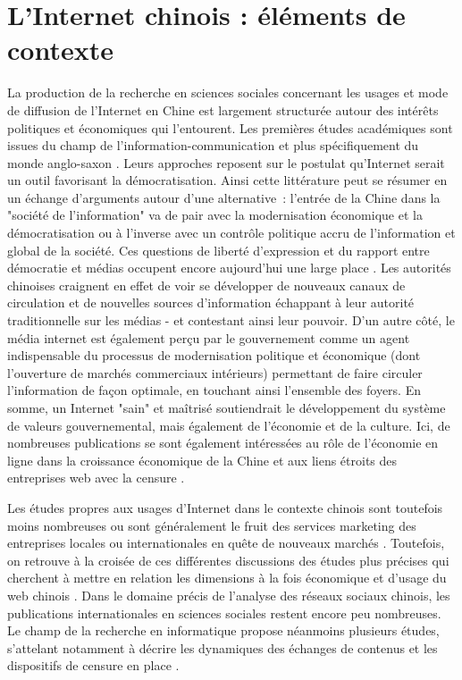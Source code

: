 \section{L’Internet chinois : éléments de contexte }
\label{sec:internet-chine}
La production de la recherche en sciences sociales concernant les usages et mode de diffusion de l’Internet en Chine est largement structurée autour des intérêts politiques et économiques qui l’entourent. Les premières études académiques sont issues du champ de l’information-communication et plus spécifiquement du monde anglo-saxon \citep{Johnson1996,Qiu2005}. Leurs approches reposent sur le postulat qu'Internet serait un outil favorisant la démocratisation. Ainsi cette littérature peut se résumer en un échange d'arguments autour d'une alternative : l'entrée de la Chine dans la "société de l'information" va de pair avec la modernisation économique et la démocratisation ou à l’inverse avec un contrôle politique accru de l'information et global de la société. Ces questions de liberté d’expression et du rapport entre démocratie et médias occupent encore aujourd’hui une large place \citep{MacKinnon2009, Douzet2007, Yang2008}. Les autorités chinoises craignent en effet de voir se développer de nouveaux canaux de circulation et de nouvelles sources d'information échappant à leur autorité traditionnelle sur les médias - et contestant ainsi leur pouvoir. D'un autre côté, le média internet est également perçu par le gouvernement comme un agent indispensable du processus de modernisation politique et économique (dont l’ouverture de marchés commerciaux intérieurs) permettant de faire circuler l’information de façon optimale, en touchant ainsi l’ensemble des foyers. En somme, un Internet "sain" et maîtrisé soutiendrait le développement du système de valeurs gouvernemental, mais également de l’économie et de la culture. Ici, de nombreuses publications se sont également intéressées au rôle de l’économie en ligne dans la croissance économique de la Chine et aux liens étroits des entreprises web avec la censure \citep{Dann2008}.

Les études propres aux usages d’Internet dans le contexte chinois sont toutefois moins nombreuses ou sont généralement le fruit des services marketing des entreprises locales ou internationales en quête de nouveaux marchés \citep{Hwang2005, Bergstrom2012}. Toutefois, on retrouve à la croisée de ces différentes discussions des études plus précises qui cherchent à mettre en relation les dimensions à la fois économique et d’usage du web chinois \citep{Puel2009, Fernandez2010}. Dans le domaine précis de l’analyse des réseaux sociaux chinois, les publications internationales en sciences sociales restent encore peu nombreuses. Le champ de la recherche en informatique propose néanmoins plusieurs études, s’attelant notamment à décrire les dynamiques des échanges de contenus \citep{Yu2011} et les dispositifs de censure en place \citep{MacKinnon2012}. 


